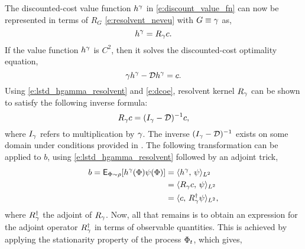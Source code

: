 The discounted-cost value function $h^\gamma$ in \eqref{e:discount_value_fn} can now be represented in terms of $R_G$ \eqref{e:resolvent_neveu} with $G \equiv \gamma$ as,
\begin{equation}
h^\discount = R_\discount c.
\label{e:lstd_hgamma_resolvent}
\end{equation}
If the value function $h^\gamma$ is $C^2$, then it solves the discounted-cost optimality equation,
\begin{equation}
\discount h^\discount - \generate h^\discount =  c.
\label{e:dcoe}
\end{equation}
Using \eqref{e:lstd_hgamma_resolvent} and \eqref{e:dcoe}, resolvent kernel $R_\gamma$ can be shown to satisfy the following inverse formula:
\begin{equation}
R_\gamma c = ( I_\gamma - {\cal D})^{-1} c,
\end{equation}
where $I_\gamma$ refers to multiplication by $\gamma$. The inverse $(I_\gamma - {\cal D})^{-1}$ exists on some domain under conditions provided in \cite{}.  
The following transformation can be applied to $b$, using \eqref{e:lstd_hgamma_resolvent} followed by an adjoint trick,
\begin{equation}
\begin{aligned}
b = {\sf E}_{\Phi \sim \rho} [h^\gamma(\Phi) \psi(\Phi) ] &= \langle h^\gamma, \, \psi \rangle_{L^2}\\
& = \langle R_\gamma c, \,\psi \rangle_{L^2} \\
& = \langle c,\, R^\dagger_\gamma \psi \rangle_{L^2},
\end{aligned}
\end{equation}
where $R^\dagger_\gamma$ the adjoint of $R_\gamma$. Now, all that remains is to obtain an expression for the adjoint operator $R^\dagger_\gamma$ in terms of observable quantities. This is achieved by applying the stationarity property of the process $\Phi_t$, which gives, 
